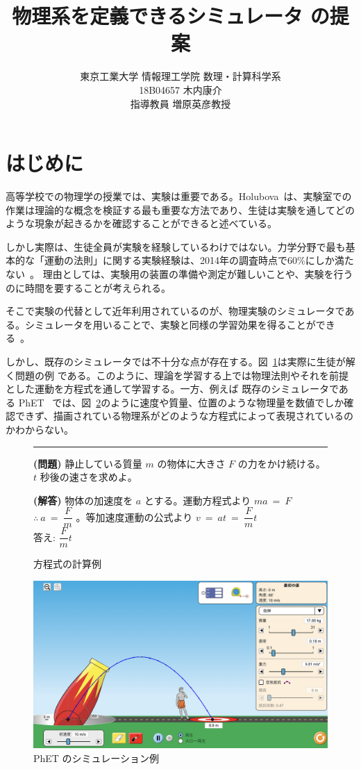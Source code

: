 \documentclass[11pt, a4paper, oneside, twocolumn, dvipdfmx]{jsarticle}
\title{\vspace{-5mm}物理系を定義できるシミュレータ \simname の提案}
\author{東京工業大学 情報理工学院 数理・計算科学系\\18B04657 木内康介\\指導教員 増原英彦教授}
\date{}
\begin{document}
\maketitle

\section{はじめに} \label{intro}
高等学校での物理学の授業では、実験は重要である。Holubova~\cite{holubova_2019}は、実験室での作業は理論的な概念を検証する最も重要な方法であり、生徒は実験を通してどのような現象が起きるかを確認することができると述べている。

しかし実際は、生徒全員が実験を経験しているわけではない。力学分野で最も基本的な「運動の法則」に関する実験経験は、2014年の調査時点で60\%にしか満たない~\cite{2015KJ00010038066}。
理由としては、実験用の装置の準備や測定が難しいことや、実験を行うのに時間を要することが考えられる。

そこで実験の代替として近年利用されているのが、物理実験のシミュレータである。シミュレータを用いることで、実験と同様の学習効果を得ることができる~\cite{ajredini_real_2014}。

しかし、既存のシミュレータでは不十分な点が存在する。図~\ref{symbol_based}は実際に生徒が解く問題の例
である。このように、理論を学習する上では物理法則やそれを前提とした運動を方程式を通して学習する。一方、例えば
既存のシミュレータである
PhET~\cite{perkins_phet_2006} では、図~\ref{numeral_based}のように速度や質量、位置のような物理量を数値でしか確認できず、描画されている物理系がどのような方程式によって表現されているのかわからない。

\begin{figure}[b]
\noindent\rule{\linewidth}{0.4pt}

\small{\textbf{(問題)} 静止している質量 $m$ の物体に大きさ $F$ の力をかけ続ける。$t$ 秒後の速さを求めよ。}

\small{\textbf{(解答)} 物体の加速度を $a$ とする。運動方程式より $ma~=~F$ $\therefore~a~=~\dfrac{F}{m}$ 。等加速度運動の公式より $v~=~at~=~\dfrac{F}{m}t$\\
答え: $\dfrac{F}{m}t$}

\caption{方程式の計算例} \label{symbol_based}
\end{figure}

\begin{figure}[thb]
\centering
\includegraphics*[width=0.9\linewidth]{figure/PhET_example.png}
\caption{PhET のシミュレーション例} \label{numeral_based}
\end{figure}
\end{document}
